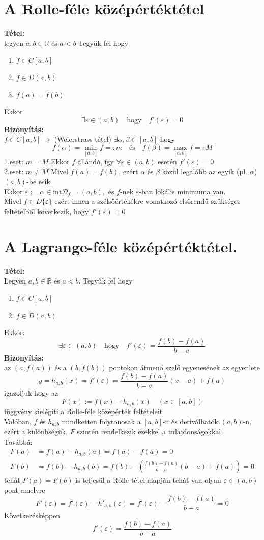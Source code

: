 \documentclass[10pt,a4paper]{article}
\newcommand{\R}{\mathbb{R}}
\newcommand{\D}{\mathcal{D}}
\newcommand{\f}[1][x]{f(#1)}
\begin{document}
\section{A Rolle-féle középértéktétel}
\textbf{Tétel:} \\
legyen $a,b \in \R$ és $a<b$ Tegyük fel hogy 
\begin{enumerate}
\item $f\in C[a,b]$
\item $f\in D(a,b)$
\item $f(a)=f(b)$
\end{enumerate}
Ekkor
\[
\exists \varepsilon \in (a,b) \quad \text{hogy} \quad f'(\varepsilon) = 0
\]
\textbf{Bizonyítás:} \\
$f\in C[a,b] \rightarrow$ (Weierstrass-tétel) $\exists \alpha, \beta \in [a,b]$ hogy
\[
f(\alpha) = \min_{[a,b]} f=:m \quad \text{és} \quad f(\beta)  = \max_{[a,b]} f=:M
\]
1.eset: $m=M$ Ekkor $f$ állandó, így $\forall \varepsilon \in (a,b)$ esetén $f'(\varepsilon) = 0$ \\
2.eset: $m\neq M$ Mivel $f(a)=f(b)$, ezért $\alpha$ és $\beta$ közül legalább az egyik (pl. $\alpha$) $(a,b)$-be esik \\
Ekkor $\varepsilon :=\alpha \in \text{int}\D_f = (a,b),$ és $f$-nek $\varepsilon$-ban lokális minimuma van.  \\
Mivel $f\in D\{\varepsilon\}$ ezért innen a szélsőértékékre vonatkozó elsőrendű szükséges feltételből következik, hogy $f'(\varepsilon) = 0$
\newpage
\section{A Lagrange-féle középértéktétel.}
\textbf{Tétel:}\\
Legyen $a,b\in\R$ és $a<b$. Tegyük fel hogy 
\begin{enumerate}
\item $f\in C [a,b]$
\item $f\in D(a,b)$
\end{enumerate}
Ekkor:
\[
\exists \varepsilon \in (a,b) \quad \text{hogy} \quad f'(\varepsilon) = \frac{f(b)-f(a)}{b-a}
\]
\textbf{Bizonyítás:}\\
az $(a,f(a))$ és a $(b,f(b))$ pontokon átmenő szelő egyenesének az egyenlete
\[
y = h_{a,b} (x) = f'(\varepsilon) = \frac{f(b)-f(a)}{b-a} (x-a) +f(a)
\]
igazoljuk hogy az 
\[
F(x) := \f - h_{a,b} (x) \quad (x\in [a,b])
\]
függvény kielégíti a Rolle-féle középérték feltételeit \\
Valóban, $f$ és $h_{a,b}$ mindketten folytonosak a $[a,b]$-n és deriválhatók $(a,b)$-n, ezért a különbségük, $F$ szintén rendelkezik ezekkel a tulajdonságokkal \\
Továbbá: 
\begin{align*}
F(a) &= f(a) - h_{a,b} (a) = f(a)-f(a) =0 \\
F(b) &= f(b)- h_{a,b} (b) = f(b) - (\frac{f(b)-f(a)}{b-a}(b-a)+f(a))=0
\end{align*}
tehát $F(a)=F(b)$ is teljesül a Rolle-tétel alapján tehát van olyan $\varepsilon \in (a,b)$ pont amelyre 
\[
F'(\varepsilon) = f'(\varepsilon) -h'_{a,b} (\varepsilon) = f'(\varepsilon) - \frac{f(b)-f(a)}{b-a} = 0
\] 
Következésképpen
\[
f'(\varepsilon) = \frac{f(b)-f(a)}{b-a}
\]
\newpage
\end{document}
